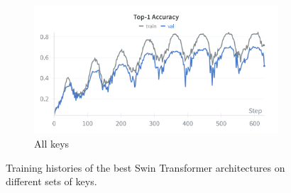 \documentclass[a4paper,11pt,twoside]{report}
\theoremstyle{definition}
\begin{document}
\begin{figure}[H]
\begin{subfigure}{\linewidth}
\begin{minipage}{0.49\linewidth}
    \end{minipage}
    \hfill
    \begin{minipage}{0.49\linewidth}
        \centering
        \includegraphics[width=\linewidth]{img_appendix/acc_all_swin_all.png}
    \end{minipage}
    \caption{All keys}
\end{subfigure}

\caption{Training histories of the best Swin Transformer architectures on different sets of keys.}
\end{figure}
\end{document}
